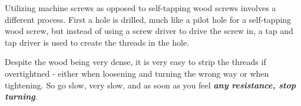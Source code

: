 \par\medskip

Utilizing machine screws as opposed to self-tapping wood screws involves a
different process.  First a hole is drilled, much like a pilot hole for a
self-tapping wood screw, but instead of using a screw driver to drive the screw
in, a tap and tap driver is used to create the threads in the hole.

\par\medskip

Despite the wood being very dense, it is very easy to strip the threads if
overtightned - either when loosening and turning the wrong way or when
tightening.  So go slow, very slow, and as soon as you feel
\textit{\bfseries any resistance, stop turning}.


